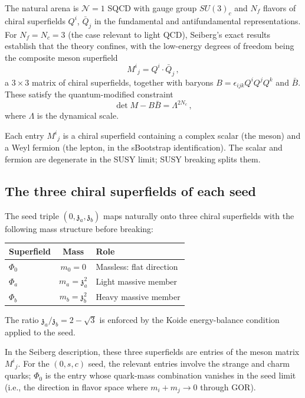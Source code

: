 \documentclass[12pt,a4paper]{article}
\newcommand{\zch}{\mathfrak{z}}
\begin{document}
The natural arena is $\mathcal{N}=1$ SQCD with gauge group $SU(3)_c$ 
and $N_f$ flavors of chiral superfields $Q^i$, $\bar{Q}_j$ in the 
fundamental and antifundamental representations. For $N_f = N_c = 3$ 
(the case relevant to light QCD), Seiberg's exact results 
\cite{Seiberg1995} establish that the theory confines, with the 
low-energy degrees of freedom being the composite meson superfield
\begin{equation}
M^i{}_j = Q^i \cdot \bar{Q}_j\,,
\end{equation}
a $3\times 3$ matrix of chiral superfields, together with baryons 
$B = \epsilon_{ijk}Q^iQ^jQ^k$ and $\bar{B}$. These satisfy the 
quantum-modified constraint
\begin{equation}
\label{eq:seiberg}
\det M - B\bar{B} = \Lambda^{2N_c}\,,
\end{equation}
where $\Lambda$ is the dynamical scale.

Each entry $M^i{}_j$ is a chiral superfield containing a complex 
scalar (the meson) and a Weyl fermion (the lepton, in the sBootstrap 
identification). The scalar and fermion are degenerate in the SUSY 
limit; SUSY breaking splits them.

\subsection{The three chiral superfields of each seed}

The seed triple $(0, \zch_a, \zch_b)$ maps naturally onto three 
chiral superfields with the following mass structure before breaking:

\begin{center}
\begin{tabular}{lcl}
\toprule
Superfield & Mass & Role \\
\midrule
$\Phi_0$ & $m_0 = 0$ & Massless: flat direction \\
$\Phi_a$ & $m_a = \zch_a^2$ & Light massive member \\
$\Phi_b$ & $m_b = \zch_b^2$ & Heavy massive member \\
\bottomrule
\end{tabular}
\end{center}

The ratio $\zch_a/\zch_b = 2 - \sqrt{3}$ is enforced by the 
Koide energy-balance condition applied to the seed.

In the Seiberg description, these three superfields are entries of 
the meson matrix $M^i{}_j$. For the $(0, s, c)$ seed, the relevant 
entries involve the strange and charm quarks; $\Phi_0$ is the entry 
whose quark-mass combination vanishes in the seed limit (i.e., the 
direction in flavor space where $m_i + m_j \to 0$ through GOR).
\end{document}
